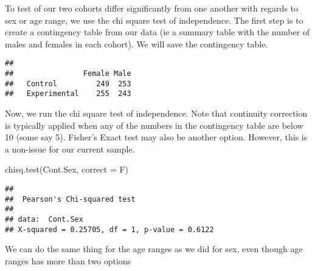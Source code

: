 \documentclass[
]{book}
\newenvironment{Shaded}{\begin{snugshade}}{\end{snugshade}}
\newcommand{\AttributeTok}[1]{\textcolor[rgb]{0.77,0.63,0.00}{#1}}
\newcommand{\FunctionTok}[1]{\textcolor[rgb]{0.00,0.00,0.00}{#1}}
\newcommand{\NormalTok}[1]{#1}
\newcommand{\OtherTok}[1]{\textcolor[rgb]{0.56,0.35,0.01}{#1}}
\newcommand{\SpecialCharTok}[1]{\textcolor[rgb]{0.00,0.00,0.00}{#1}}
\theoremstyle{definition}
\theoremstyle{definition}
\theoremstyle{definition}
\theoremstyle{definition}
\theoremstyle{remark}
\begin{document}
To test of our two cohorts differ significantly from one another with regards to sex or age range, we use the chi square test of independence. The first step is to create a contingency table from our data (ie a summary table with the number of males and females in each cohort). We will save the contingency table.

\begin{Shaded}
\end{Shaded}

\begin{verbatim}
##               
##                Female Male
##   Control         249  253
##   Experimental    255  243
\end{verbatim}

\begin{Shaded}
\end{Shaded}

Now, we run the chi square test of independence. Note that continuity correction is typically applied when any of the numbers in the contingency table are below 10 (some say 5). Fisher's Exact test may also be another option. However, this is a non-issue for our current sample.

\begin{Shaded}
\begin{Highlighting}[]
\FunctionTok{chisq.test}\NormalTok{(Cont.Sex, }\AttributeTok{correct =}\NormalTok{ F)}
\end{Highlighting}
\end{Shaded}

\begin{verbatim}
## 
##  Pearson's Chi-squared test
## 
## data:  Cont.Sex
## X-squared = 0.25705, df = 1, p-value = 0.6122
\end{verbatim}

We can do the same thing for the age ranges as we did for sex, even though age ranges has more than two options

\begin{Shaded}
\end{Shaded}
\end{document}
